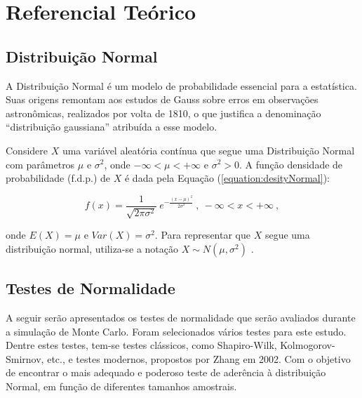 \documentclass[a4paper,11pt]{article} %
\begin{document}
\section{Referencial Teórico} %

\subsection{Distribuição Normal} %

A Distribuição Normal é um modelo de probabilidade essencial para a estatística. Suas origens remontam aos estudos de Gauss sobre erros em observações astronômicas, realizados por volta de 1810, o que justifica a denominação “distribuição gaussiana” atribuída a esse modelo.

\vspace{0.5cm}

Considere $X$ uma variável aleatória contínua que segue uma Distribuição Normal com parâmetros $\mu$ e $\sigma^{2}$, onde $-\infty < \mu < +\infty$ e $\sigma^{2} > 0$. A função densidade de probabilidade (f.d.p.) de $X$ é dada pela Equação (\ref{equation:desityNormal}):

\begin{equation}
    f(x) = \dfrac{1}{\sqrt{2 \pi \sigma^2}} \ e^{{- \frac{(x - \mu)^{2}}{2 \sigma^2}}} \ , \ - \infty < x < +\infty \ ,
    \label{equation:desityNormal}
\end{equation}

\noindent onde $E(X) = \mu$ e $Var(X) = \sigma^2$. Para representar que $X$ segue uma distribuição normal, utiliza-se a notação $X \sim N(\mu, \sigma^2)$ \cite{bussab2010estatistica}.

\subsection{Testes de Normalidade} \label{section:tests_norm} %

A seguir serão apresentados os testes de normalidade que serão avaliados durante a simulação de Monte Carlo. Foram selecionados vários testes para este estudo. Dentre estes testes, tem-se testes clássicos, como Shapiro-Wilk, Kolmogorov-Smirnov, etc., e testes modernos, propostos por Zhang em 2002. Com o objetivo de encontrar o mais adequado e poderoso teste de aderência à distribuição Normal, em função de diferentes tamanhos amostrais.
\end{document}
